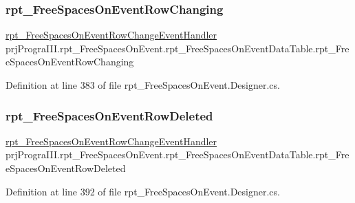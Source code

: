 \subsubsection{\texorpdfstring{rpt\+\_\+\+Free\+Spaces\+On\+Event\+Row\+Changing}{rpt\_FreeSpacesOnEventRowChanging}}
{\footnotesize\ttfamily \hyperlink{classprj_progra_i_i_i_1_1rpt___free_spaces_on_event_a19ccb59e3a6fc2f077280510cfdf1d21}{rpt\+\_\+\+Free\+Spaces\+On\+Event\+Row\+Change\+Event\+Handler} prj\+Progra\+I\+I\+I.\+rpt\+\_\+\+Free\+Spaces\+On\+Event.\+rpt\+\_\+\+Free\+Spaces\+On\+Event\+Data\+Table.\+rpt\+\_\+\+Free\+Spaces\+On\+Event\+Row\+Changing}



Definition at line 383 of file rpt\+\_\+\+Free\+Spaces\+On\+Event.\+Designer.\+cs.

\hypertarget{classprj_progra_i_i_i_1_1rpt___free_spaces_on_event_1_1rpt___free_spaces_on_event_data_table_a87eff98bca7a64ea0fac5dd531f46a03}{}\label{classprj_progra_i_i_i_1_1rpt___free_spaces_on_event_1_1rpt___free_spaces_on_event_data_table_a87eff98bca7a64ea0fac5dd531f46a03} 
\subsubsection{\texorpdfstring{rpt\+\_\+\+Free\+Spaces\+On\+Event\+Row\+Deleted}{rpt\_FreeSpacesOnEventRowDeleted}}
{\footnotesize\ttfamily \hyperlink{classprj_progra_i_i_i_1_1rpt___free_spaces_on_event_a19ccb59e3a6fc2f077280510cfdf1d21}{rpt\+\_\+\+Free\+Spaces\+On\+Event\+Row\+Change\+Event\+Handler} prj\+Progra\+I\+I\+I.\+rpt\+\_\+\+Free\+Spaces\+On\+Event.\+rpt\+\_\+\+Free\+Spaces\+On\+Event\+Data\+Table.\+rpt\+\_\+\+Free\+Spaces\+On\+Event\+Row\+Deleted}



Definition at line 392 of file rpt\+\_\+\+Free\+Spaces\+On\+Event.\+Designer.\+cs.

